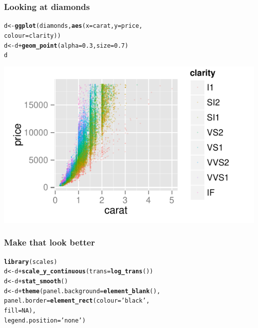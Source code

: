 \documentclass{beamer}\usepackage{graphicx, color}
\makeatletter
\def\maxwidth{ %
  \ifdim\Gin@nat@width>\linewidth
    \linewidth
  \else
    \Gin@nat@width
  \fi
}
\newcommand{\hlfunctioncall}[1]{\textcolor[rgb]{0.501960784313725,0,0.329411764705882}{\textbf{#1}}}%
\newcommand{\hlstring}[1]{\textcolor[rgb]{0.6,0.6,1}{#1}}%
\newenvironment{kframe}{%
 \def\at@end@of@kframe{}%
 \ifinner\ifhmode%
  \def\at@end@of@kframe{\end{minipage}}%
  \begin{minipage}{\columnwidth}%
 \fi\fi%
 \def\FrameCommand##1{\hskip\@totalleftmargin \hskip-\fboxsep
 \colorbox{shadecolor}{##1}\hskip-\fboxsep
     \hskip-\linewidth \hskip-\@totalleftmargin \hskip\columnwidth}%
 \MakeFramed {\advance\hsize-\width
   \@totalleftmargin\z@ \linewidth\hsize
   \@setminipage}}%
 {\par\unskip\endMakeFramed%
 \at@end@of@kframe}
\newenvironment{knitrout}{}{} %
\makeatother
\begin{document}
\begin{frame}[fragile]
  \frametitle{Looking at diamonds}
\begin{knitrout}
\color{fgcolor}\begin{kframe}
\begin{alltt}
d <- \hlfunctioncall{ggplot}(diamonds, \hlfunctioncall{aes}(x = carat, y = price, 
                          colour = clarity))
d <- d + \hlfunctioncall{geom_point}(alpha = 0.3, size = 0.7)
d
\end{alltt}
\end{kframe}
\includegraphics[width=\maxwidth]{figure/dia} 

\end{knitrout}


\end{frame}

\begin{frame}[fragile]
  \frametitle{Make that look better}
\begin{knitrout}\scriptsize
{}\color{fgcolor}\begin{kframe}
\begin{alltt}
\hlfunctioncall{library}(scales)
d <- d + \hlfunctioncall{scale_y_continuous}(trans = \hlfunctioncall{log_trans}())
d <- d + \hlfunctioncall{stat_smooth}()
d <- d + \hlfunctioncall{theme}(panel.background = \hlfunctioncall{element_blank}(),
               panel.border = \hlfunctioncall{element_rect}(colour = \hlstring{'black'}, 
                                           fill = NA),
               legend.position = \hlstring{'none'})
\end{alltt}
\end{kframe}
\end{knitrout}


\end{frame}
\end{document}
